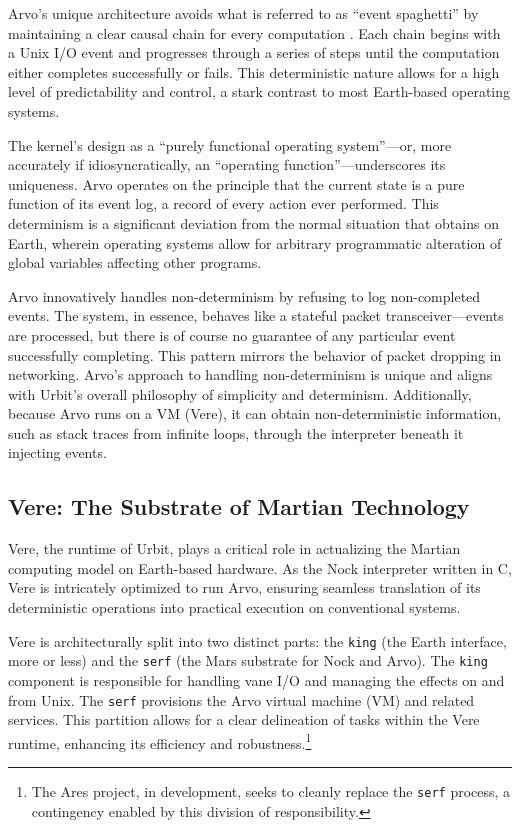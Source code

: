 \documentclass[twoside]{article}
\begin{document}
Arvo's unique architecture avoids what is referred to as ``event spaghetti'' by maintaining a clear causal chain for every computation \citep{Whitepaper}.  Each chain begins with a Unix I/O event and progresses through a series of steps until the computation either completes successfully or fails.  This deterministic nature allows for a high level of predictability and control, a stark contrast to most Earth-based operating systems.

The kernel's design as a ``purely functional operating system''—or, more accurately if idiosyncratically, an ``operating function''—underscores its uniqueness.  Arvo operates on the principle that the current state is a pure function of its event log, a record of every action ever performed.  This determinism is a significant deviation from the normal situation that obtains on Earth, wherein operating systems allow for arbitrary programmatic alteration of global variables affecting other programs.

Arvo innovatively handles non-determinism by refusing to log non-completed events.  The system, in essence, behaves like a stateful packet transceiver—events are processed, but there is of course no guarantee of any particular event successfully completing.  This pattern mirrors the behavior of packet dropping in networking. Arvo's approach to handling non-deter\-minism is unique and aligns with Urbit's overall philosophy of simplicity and determinism.  Additionally, because Arvo runs on a VM (Vere), it can obtain non-deterministic information, such as stack traces from infinite loops, through the interpreter beneath it injecting events.

\subsection{Vere: The Substrate of Martian Technology}

Vere, the runtime of Urbit, plays a critical role in actualizing the Martian computing model on Earth-based hardware.  As the Nock interpreter written in C, Vere is intricately optimized to run Arvo, ensuring seamless translation of its deterministic operations into practical execution on conventional systems.

Vere is architecturally split into two distinct parts:  the \texttt{king} (the Earth interface, more or less) and the \texttt{serf} (the Mars substrate for Nock and Arvo).  The \texttt{king} component is responsible for handling vane I/O and managing the effects on and from Unix.  The \texttt{serf} provisions the Arvo virtual machine (VM) and related services.  This partition allows for a clear delineation of tasks within the Vere runtime, enhancing its efficiency and robustness.\footnote{The Ares project, in development, seeks to cleanly replace the \texttt{serf} process, a contingency enabled by this division of responsibility.}
\end{document}
